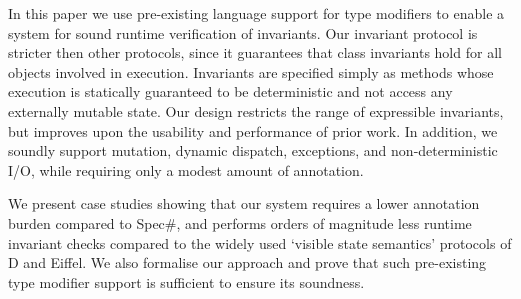 In this paper we use pre-existing language support for type modifiers to enable a system for sound runtime verification of invariants.
Our invariant protocol is stricter then other  protocols, since it guarantees that class invariants hold for all objects involved in execution.
Invariants are specified simply as methods whose execution is statically guaranteed to be deterministic and not access any externally mutable state.
Our design restricts the range of expressible invariants, but improves upon the usability and performance of prior work.
In addition, we soundly support mutation, dynamic dispatch, exceptions, and non-deterministic I/O, while requiring only a modest amount of annotation.

We present case studies showing that our system requires a lower annotation burden compared to Spec\#, and  performs orders of magnitude less runtime invariant checks compared to the widely used `visible state semantics' protocols of D and Eiffel.
We also formalise our approach and prove that such pre-existing type modifier support is sufficient to ensure its soundness. %